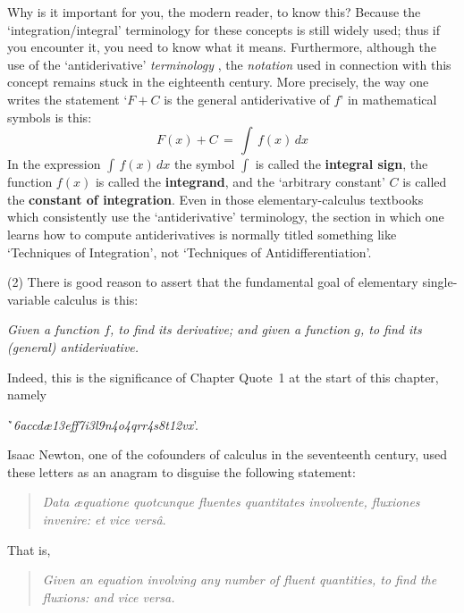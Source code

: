         Why is it important for you, the modern reader, to know this? Because the `integration/integral' terminology for these concepts is still widely used;
    thus if you encounter it, you need to know what it means. Furthermore, although the use of the `antiderivative' {\em terminology} ,
    the {\em notation} used in connection with this concept remains stuck in the eighteenth century.
    More precisely, the way one writes the statement `$F+C$ is the general antiderivative of $f$' in mathematical symbols is this:
        \begin{displaymath}
        F(x)+C \,=\, \int\, f(x)\,dx
        \end{displaymath}
    In the expression ${\displaystyle \int\, f(x)\,dx}$ the symbol ${\displaystyle \int}$ is called the {\bf integral sign},
    the function $f(x)$ is called the {\bf integrand}, and the `arbitrary constant' $C$ is called the {\bf constant of integration}.
    Even in those elementary-calculus textbooks which consistently use the `antiderivative' terminology,
     the section in which one learns how to compute antiderivatives is normally titled something like `Techniques of Integration',
    not `Techniques of Antidifferentiation'.

\V

        (2) There is good reason to assert that the fundamental goal of elementary single-variable calculus is this:

\VA

    \h {\em Given a function $f$, to find its derivative;
    and given a function $g$, to find its (general) antiderivative.}

\VA

\noindent Indeed, this is the significance of Chapter Quote~{1} at the start of this chapter, namely 

\VA

        \h `{\em 6accd{\ae}13eff7i3l9n4o4qrr4s8t12vx}'.

\VA

\noindent Isaac Newton, one of the cofounders of calculus in the seventeenth century, used these letters as an anagram to disguise the following statement:

\begin{quotation}
{\footnotesize
      {\em Data {\ae}quatione quotcunque fluentes quantitates involvente, fluxiones invenire: et vice vers\^{a}}.
}%
\end{quotation}

    That is,
\begin{quotation}
{\footnotesize 
    \em Given an equation involving any number of fluent quantities, to find the fluxions: and vice versa.
}%
\end{quotation}

